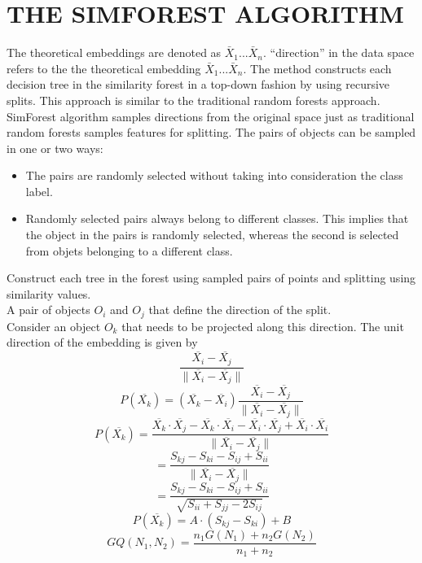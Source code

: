 \documentclass{article}
\begin{document}
\section{THE SIMFOREST ALGORITHM}
The theoretical embeddings are denoted as ${\bar{X}_1}$...${\bar{X}_n}$. ``direction'' in the data space refers to the the theoretical embedding  ${\bar{X}_1}$...${\bar{X}_n}$. The method constructs each decision tree in the similarity forest in a top-down fashion by using recursive splits. This approach is similar to the traditional random forests approach. SimForest algorithm samples directions from the original space just as traditional random forests samples features for splitting. The pairs of objects can be sampled in one or two ways:\\
\begin{itemize}
\item The pairs are randomly selected without taking into consideration the class label.
\item Randomly selected pairs always belong to different classes. This implies that the object in the pairs is randomly selected, whereas the second is selected from objets belonging to a different class.
\end{itemize}
 
Construct each tree in the forest using sampled pairs of points and splitting using similarity values.\\
A pair of objects $O_i$ and $O_j$ that define the direction of the split.\\
Consider an object $O_k$ that needs to be projected along this direction. The unit direction of the embedding is given by\\

$$\frac{\overline{X_{i}}-\overline{X_{j}}}{ \parallel \overline{X_{i}}-\overline{X_{j}} \parallel}$$
 $$ P(\overline{X_{k}})=(\overline{X_{k}}-\overline{X_{i}})\frac{\overline{X_{i}}-\overline{X_{j}}}{ \parallel \overline{X_{i}}-\overline{X_{j}} \parallel}$$
 $$P(\overline{X_{k}})= \frac{\overline{X_{k}} \cdot \overline{X_{j}}-\overline{X_{k}} \cdot \overline{X_{i}} -\overline{X_{i}} \cdot \overline{X_{j}}+\overline{X_{i}} \cdot \overline{X_{i}}}{\parallel \overline{X_{i}}-\overline{X_{j}} \parallel} $$
 $$=\frac {S_{kj}-S_{ki}-S_{ij}+S_{ii}}{\parallel \overline{X_{i}}-\overline{X_{j}} \parallel}$$
 $$=\frac {S_{kj}-S_{ki}-S_{ij}+S_{ii}}{\sqrt{S_{ii}+S_{jj}-2S_{ij}}}$$
 $$P(\overline{X_{k}})=A\cdot (S_{kj}-S_{ki})+B$$
 $$GQ(N_{1},N_{2})=\frac {n_{1}G(N_{1})+n_{2}G(N_{2})}{n_{1}+n_{2}}$$
\end{document}
